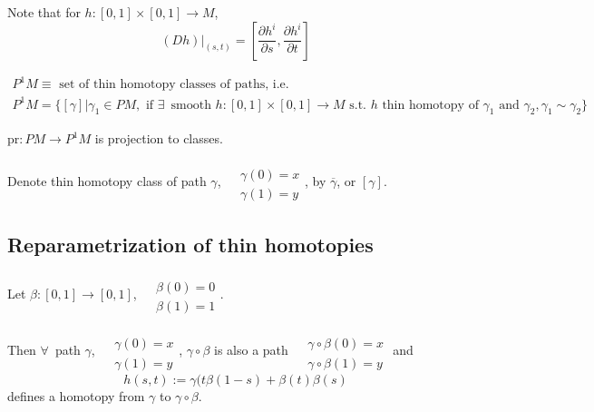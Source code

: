 \documentclass[10pt]{amsart}
\begin{document}
\begin{multicols*}{2}
Note that for $h:[0,1] \times [0,1] \to M$, 
\[
\left. (Dh) \right|_{(s,t)} = \left[ \frac{ \partial h^i }{ \partial s} , \frac{\partial h^i }{ \partial t} \right]
\]


\begin{equation}
\begin{gathered}
P^1 M \equiv \text{ set of thin homotopy classes of paths, i.e. } \\ 
P^1 M = \lbrace [ \gamma] | \gamma_1 \in PM, \text{ if } \exists \, \text{ smooth } h:[0,1]\times [0,1] \to M \text{ s.t. } h \text{ thin homotopy of } \gamma_1 \text{ and } \gamma_2, \gamma_1 \sim \gamma_2 \rbrace
\end{gathered}
\end{equation}

$\text{pr}:PM \to P^1M$ is projection to classes.

Denote thin homotopy class of path $\gamma$, $\begin{aligned} & \qquad \\ 
& \gamma(0) = x \\
& \gamma(1) = y \end{aligned}$, by $\overline{\gamma}$, or $[\gamma]$.  

\subsection{Reparametrization of thin homotopies}

Let $\beta: [0,1] \to [0,1]$, $\begin{aligned} & \quad \\ 
& \beta(0) = 0 \\
& \beta(1) = 1 \end{aligned}$.  

Then $\forall \, $ path $\gamma$, $\begin{aligned} & \quad \\ 
& \gamma(0) = x \\
& \gamma(1) = y \end{aligned}$, $\gamma \circ \beta$ is also a path $\begin{aligned} & \quad \\ 
& \gamma\circ \beta(0) = x \\
& \gamma\circ \beta(1) = y \end{aligned}$ and 
\begin{equation}
h(s,t) := \gamma(t\beta(1-s) + \beta(t) \beta(s)
\end{equation}
defines a homotopy from $\gamma$ to $\gamma \circ \beta$.


\end{multicols*}
\end{document}

